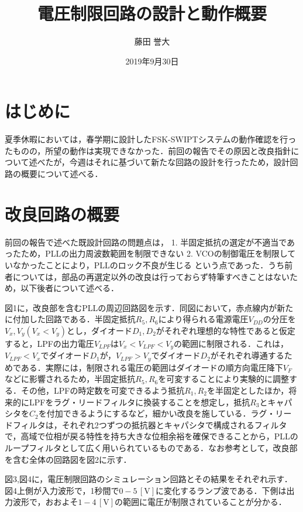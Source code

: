 \documentclass[twocolumn]{jsarticle}
\begin{document}
\title{電圧制限回路の設計と動作概要}
\author{藤田 誉大}
\date{2019年9月30日}
\maketitle

\section{はじめに}
夏季休暇においては，春学期に設計したFSK-SWIPTシステムの動作確認を行ったものの，所望の動作は実現できなかった．前回の報告でその原因と改良指針について述べたが，今週はそれに基づいて新たな回路の設計を行ったため，設計回路の概要について述べる．

\section{改良回路の概要}
前回の報告で述べた既設計回路の問題点は， 1. 半固定抵抗の選定が不適当であったため，PLLの出力周波数範囲を制限できない 2. VCOの制御電圧を制限していなかったことにより，PLLのロック不良が生じる  という点であった．うち前者については，部品の再選定以外の改良は行っておらず特筆すべきことはないため，以下後者について述べる．\par 
図1に，改良部を含むPLLの周辺回路図を示す．同図において，赤点線内が新たに付加した回路である．半固定抵抗$R_5,R_6$により得られる電源電圧$V_{DD}$の分圧を$V_x, V_y (V_x<V_y)$とし，ダイオード$D_1,D_2$がそれぞれ理想的な特性であると仮定すると，LPFの出力電圧$V_{LPF}$は$V_x<V_{LPF}<V_y$の範囲に制限される．これは，$V_{LPF}<V_x$でダイオード$D_1$が，$V_{LPF}>V_y$でダイオード$D_2$がそれぞれ導通するためである．実際には，制限される電圧の範囲はダイオードの順方向電圧降下$V_F$などに影響されるため，半固定抵抗$R_5,R_6$を可変することにより実験的に調整する．その他，LPFの時定数を可変できるよう抵抗$R_1,R_2$を半固定としたほか，将来的にLPFをラグ・リードフィルタに換装することを想定し，抵抗$R_3$とキャパシタを$C_2$を付加できるようにするなど，細かい改良を施している．ラグ・リードフィルタは，それぞれ2つずつの抵抗器とキャパシタで構成されるフィルタで，高域で位相が戻る特性を持ち大きな位相余裕を確保できることから，PLLのループフィルタとして広く用いられているものである\cite{Enzaka2014}．なお参考として，改良部を含む全体の回路図を図2に示す．\par
図3,図4に，電圧制限回路のシミュレーション回路とその結果をそれぞれ示す．図4上側が入力波形で，1秒間で$0-5 \, \mathrm{[V]}$に変化するランプ波である．下側は出力波形で，おおよそ$1-4 \, \mathrm{[V]}$の範囲に電圧が制限されていることが分かる．
\end{document}
